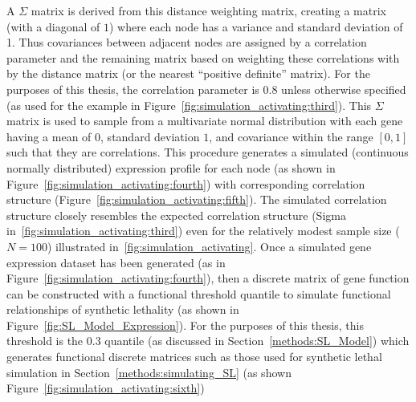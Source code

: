 A $\Sigma$ matrix is derived from this distance weighting matrix, creating a matrix (with a diagonal of $1$) where each node has a variance and standard deviation of 1. Thus covariances between adjacent nodes are assigned by a correlation parameter and the remaining matrix based on weighting these correlations with by the distance matrix (or the nearest ``positive definite'' matrix). For the purposes of this thesis, the correlation parameter is $0.8$ unless otherwise specified (as used for the example in Figure~\ref{fig:simulation_activating:third}). This $\Sigma$ matrix is used to sample from a multivariate normal distribution with each gene having a mean of $0$, standard deviation $1$, and covariance within the range $[0,1]$ such that they are correlations. This procedure generates a simulated (continuous normally distributed) expression profile for each node (as shown in Figure~\ref{fig:simulation_activating:fourth}) with corresponding correlation structure (Figure~\ref{fig:simulation_activating:fifth}). The simulated correlation structure closely resembles the expected correlation structure (Sigma in~\ref{fig:simulation_activating:third}) even for the relatively modest sample size ($N=100$) illustrated in~\ref{fig:simulation_activating}. Once a simulated gene expression dataset has been generated (as in Figure~\ref{fig:simulation_activating:fourth}), then a discrete matrix of gene function can be constructed with a functional threshold quantile to simulate functional relationships of synthetic lethality (as shown in Figure~\ref{fig:SL_Model_Expression}). For the purposes of this thesis, this threshold is the 0.3 quantile (as discussed in Section~\ref{methods:SL_Model}) which generates functional discrete matrices such as those used for synthetic lethal simulation in Section~\ref{methods:simulating_SL} (as shown Figure~\ref{fig:simulation_activating:sixth})

